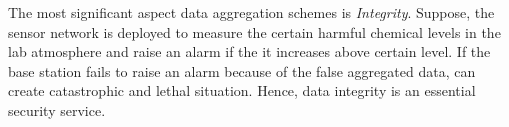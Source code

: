 

	The  most significant aspect data aggregation schemes is \textit{Integrity}.
	Suppose, the sensor network is deployed to measure the certain harmful chemical levels in the lab atmosphere and raise an alarm if the it increases above certain level.
	If the base station fails to raise an alarm because of the false aggregated data, can create catastrophic and lethal situation.
	Hence, data integrity is an essential security service.
	

